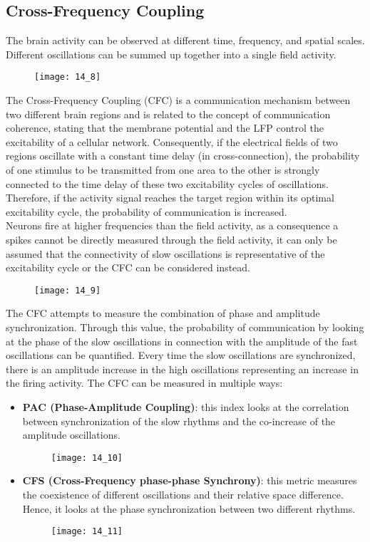 \subsection{Cross-Frequency Coupling}
The brain activity can be observed at different time, frequency, and spatial scales. Different
oscillations can be summed up together into a single field activity.
\begin{figure}[H]
    \centering
    \texttt{[image: 14\_8]}
\end{figure}
The Cross-Frequency Coupling (CFC) is a communication mechanism between two different brain regions and is
related to the concept of communication coherence, stating that the membrane potential and the LFP
control the excitability of a cellular network. Consequently, if the electrical fields of two regions
oscillate with a constant time delay (in cross-connection), the probability of one stimulus to be
transmitted from one area to the other is strongly connected to the time delay of these two excitability
cycles of oscillations. Therefore, if the activity signal reaches the target region within its optimal
excitability cycle, the probability of communication is increased.\\
Neurons fire at higher frequencies than the field activity, as a consequence a spikes cannot be directly
measured through the field activity, it can only be assumed that the connectivity of slow oscillations
is representative of the excitability cycle or the CFC can be considered instead.
\begin{figure}[H]
    \centering
    \texttt{[image: 14\_9]}
\end{figure}
The CFC attempts to measure the combination of phase and amplitude synchronization. Through this value,
the probability of communication by looking at the phase of the slow oscillations in connection with
the amplitude of the fast oscillations can be quantified. Every time the slow oscillations are
synchronized, there is an amplitude increase in the high oscillations representing an increase in the
firing activity. The CFC can be measured in multiple ways:
\begin{itemize}
    \item \textbf{PAC (Phase-Amplitude Coupling)}: this index looks at the correlation between
          synchronization of the slow rhythms and the co-increase of the amplitude oscillations.
          \begin{figure}[H]
              \centering
              \texttt{[image: 14\_10]}
          \end{figure}
    \item \textbf{CFS (Cross-Frequency phase-phase Synchrony)}: this metric measures the coexistence of
          different oscillations and their relative space difference. Hence, it looks at the phase
          synchronization between two different rhythms.
          \begin{figure}[H]
              \centering
              \texttt{[image: 14\_11]}
          \end{figure}
\end{itemize}


